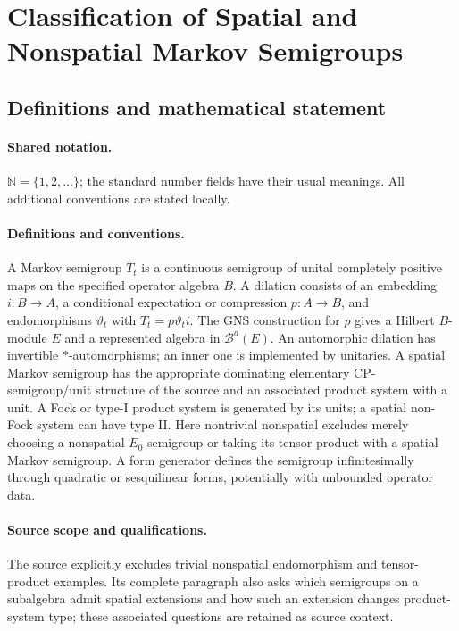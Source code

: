 \documentclass[11pt]{article}
\begin{document}
\section{Classification of Spatial and Nonspatial Markov Semigroups}\label{statement}

\subsection{Definitions and mathematical statement}

\paragraph{Shared notation.}$\mathbb N=\{1,2,\ldots\}$; the standard number fields have their usual meanings. All additional conventions are stated locally.


\paragraph{Definitions and conventions.} A Markov semigroup $T_t$ is a continuous semigroup of unital completely positive maps on the specified operator algebra $B$. A dilation consists of an embedding $i:B\to A$, a conditional expectation or compression $p:A\to B$, and endomorphisms $\vartheta_t$ with $T_t=p\vartheta_t i$. The GNS construction for $p$ gives a Hilbert $B$-module $E$ and a represented algebra in $\mathcal B^a(E)$. An automorphic dilation has invertible $*$-automorphisms; an inner one is implemented by unitaries. A spatial Markov semigroup has the appropriate dominating elementary CP-semigroup/unit structure of the source and an associated product system with a unit. A Fock or type-I product system is generated by its units; a spatial non-Fock system can have type II. Here nontrivial nonspatial excludes merely choosing a nonspatial $E_0$-semigroup or taking its tensor product with a spatial Markov semigroup. A form generator defines the semigroup infinitesimally through quadratic or sesquilinear forms, potentially with unbounded operator data.

\paragraph{Source scope and qualifications.} The source explicitly excludes trivial nonspatial endomorphism and tensor-product examples. Its complete paragraph also asks which semigroups on a subalgebra admit spatial extensions and how such an extension changes product-system type; these associated questions are retained as source context.
\end{document}
